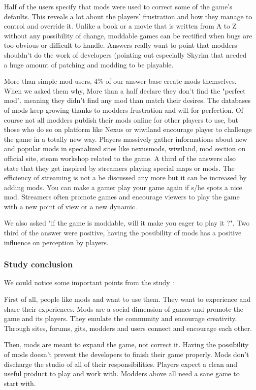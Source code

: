 \documentclass[a4paper,12pt]{article}
\begin{document}
Half of the users specify that mods were used to correct some of the game's defaults.  This reveals a lot about the players' frustration and how they manage to control and override it.
Unlike a book or a movie that is written from A to Z without any possibility of change, moddable games can be rectified when bugs are too obvious or difficult to handle. Answers really want to point that modders shouldn't do the work of developers (pointing out especially  Skyrim that needed a huge amount of patching and modding to be playable.

More than simple mod users, 4\% of our answer base create mods themselves. When we asked them why, More than a half declare they don't find the "perfect mod", meaning they didn't find any mod than match their desires. The databases of mods keep growing thanks to modders frustration and will for perfection. Of course not all modders publish their mods online for other players to use, but those who do so on platform like Nexus or wiwiland encourage player to challenge the game in a totally new way. Players massively gather informations about new and popular mods in specialized sites like nexusmods, wiwiland, mod section on official site, steam workshop related to the game. A third of the answers also state that they get inspired by streamers playing special maps or mods. The efficiency of streaming is not a be discussed any more but it can be increased by adding mods. You can make a gamer play your game again if s/he spots a nice mod. Streamers often promote games and encourage viewers to play the game with a new point of view or a new dynamic.

We also asked "if the game is moddable, will it make you eager to play it ?". Two third of the answer were positive, having the possibility of mods has a positive influence on perception by players.

\subsubsection{Study conclusion}

We could notice some important points from the study :

First of all, people like mods and want to use them. They want to experience and share their experiences. Mods are a social dimension of games and promote the game and its players. They emulate the community and encourage creativity. Through sites, forums, gits, modders and users connect and encourage each other.

Then, mods are meant to expand the game, not correct it. Having the possibility of mods doesn't prevent the developers to finish their game properly. Mods don't discharge the studio of all of their responsibilities. Players expect a clean and useful product to play and work with. Modders above all need a sane game to start with.
\end{document}
